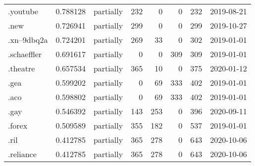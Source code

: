 \begin{tabular}{lrlrrrrl}
.youtube                  &          0.788128 &       partially &                         232 &                           0 &                           0 &                 232 &           2019-08-21 \\
.new                      &          0.726941 &       partially &                         299 &                           0 &                           0 &                 299 &           2019-10-27 \\
.xn--9dbq2a               &          0.724201 &       partially &                         269 &                          33 &                           0 &                 302 &           2019-01-01 \\
.schaeffler               &          0.691617 &       partially &                           0 &                           0 &                         309 &                 309 &           2019-01-01 \\
.theatre                  &          0.657534 &       partially &                         365 &                          10 &                           0 &                 375 &           2020-01-12 \\
.gea                      &          0.599202 &       partially &                           0 &                          69 &                         333 &                 402 &           2019-01-01 \\
.aco                      &          0.598802 &       partially &                           0 &                          69 &                         333 &                 402 &           2019-01-01 \\
.gay                      &          0.546392 &       partially &                         143 &                         253 &                           0 &                 396 &           2020-09-11 \\
.forex                    &          0.509589 &       partially &                         355 &                         182 &                           0 &                 537 &           2019-01-01 \\
.ril                      &          0.412785 &       partially &                         365 &                         278 &                           0 &                 643 &           2020-10-06 \\
.reliance                 &          0.412785 &       partially &                         365 &                         278 &                           0 &                 643 &           2020-10-06 \\

\end{tabular}
